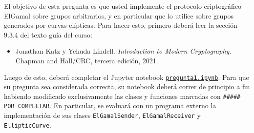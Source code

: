 
El objetivo de esta pregunta es que usted implemente el protocolo criptográfico ElGamal sobre grupos arbitrarios, y en particular que lo utilice sobre grupos generados por curvas elípticas. Para hacer esto, primero deberá leer la sección 9.3.4 del texto guía del curso:

\begin{itemize}
  \item Jonathan Katz y Yehuda Lindell. {\em Introduction to Modern Cryptography}. Chapman and Hall/CRC, tercera edición, 2021.
\end{itemize}

Luego de esto, deberá completar el Jupyter notebook \href{https://github.com/UC-IIC3253/2022/tree/main/Tareas/Tarea\%203/enunciado/pregunta1.ipynb}{\texttt{pregunta1.ipynb}}. Para que su pregunta sea considerada correcta, su notebook deberá correr de principio a fin habiendo modificado exclusivamente las clases y funciones marcadas con \texttt{\#\#\#\#\# POR COMPLETAR}. En particular, se evaluará con un programa externo la implementación de sus clases \texttt{ElGamalSender}, \texttt{ElGamalReceiver} y \texttt{EllipticCurve}.
